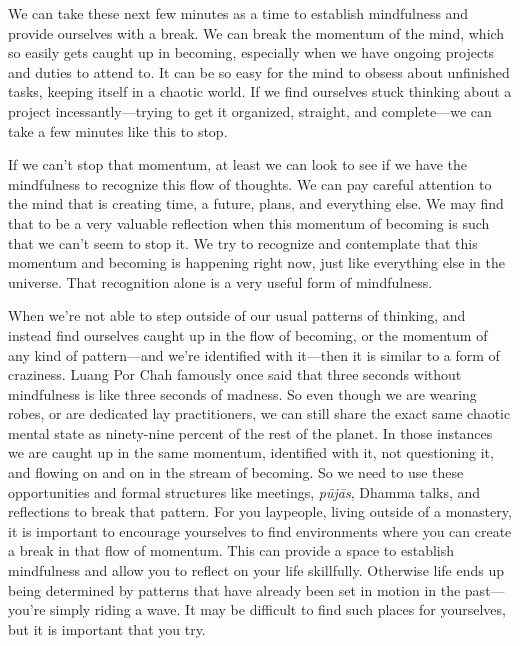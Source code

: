 
We can take these next few minutes as a time to establish mindfulness 
and provide ourselves with a break. We can break the momentum of the 
mind, which so easily gets caught up in becoming, especially when we 
have ongoing projects and duties to attend to. It can be so easy for 
the mind to obsess about unfinished tasks, keeping itself in a chaotic 
world. If we find ourselves stuck thinking about a project 
incessantly---trying to get it organized, straight, and complete---we 
can take a few minutes like this to stop.

If we can't stop that momentum, at least we can look to see if we have 
the mindfulness to recognize this flow of thoughts. We can pay careful 
attention to the mind that is creating time, a future, plans, and 
everything else. We may find that to be a very valuable reflection when 
this momentum of becoming is such that we can't seem to stop it. We try 
to recognize and contemplate that this momentum and becoming is 
happening right now, just like everything else in the universe. That 
recognition alone is a very useful form of mindfulness.

When we're not able to step outside of our usual patterns of thinking, 
and instead find ourselves caught up in the flow of becoming, or the 
momentum of any kind of pattern---and we're identified with it---then 
it is similar to a form of craziness. Luang Por Chah famously once said 
that three seconds without mindfulness is like three seconds of 
madness. So even though we are wearing robes, or are dedicated lay 
practitioners, we can still share the exact same chaotic mental state 
as ninety-nine percent of the rest of the planet. In those instances we 
are caught up in the same momentum, identified with it, not questioning 
it, and flowing on and on in the stream of becoming. So we need to use 
these opportunities and formal structures like meetings, 
\emph{pūjās}, Dhamma talks, and reflections to break that pattern. 
For you laypeople, living outside of a monastery, it is important to 
encourage yourselves to find environments where you can create a break 
in that flow of momentum. This can provide a space to establish 
mindfulness and allow you to reflect on your life skillfully. Otherwise 
life ends up being determined by patterns that have already been set in 
motion in the past---you're simply riding a wave. It may be difficult 
to find such places for yourselves, but it is important that you try.

